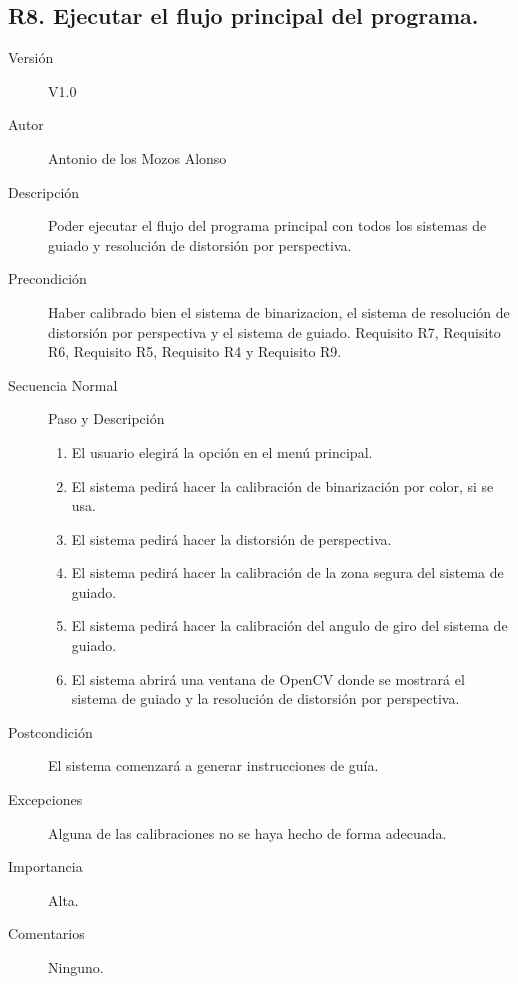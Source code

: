 \subsection{R8. Ejecutar el flujo principal del programa.}
\begin{description}
	\item [Versión] V1.0
	\item [Autor] Antonio de los Mozos Alonso
	\item [Descripción] Poder ejecutar el flujo del programa principal con todos los sistemas de guiado y resolución de distorsión por perspectiva.
	\item [Precondición] Haber calibrado bien el sistema de binarizacion, el sistema de resolución de distorsión por perspectiva y el sistema de guiado. Requisito R7, Requisito R6, Requisito R5, Requisito R4 y Requisito R9.
	\item [Secuencia Normal] Paso y Descripción
		\begin{enumerate}
			\item El usuario elegirá la opción en el menú principal.
			\item El sistema pedirá hacer la calibración de binarización por color, si se usa.
			
			\item El sistema pedirá hacer la distorsión de perspectiva.
			\item El sistema pedirá hacer la calibración de la zona segura del sistema de guiado.
			
			\item El sistema pedirá hacer la calibración del angulo de giro del sistema de guiado.
			
			\item El sistema abrirá una ventana de OpenCV donde se mostrará el sistema de guiado y la resolución de distorsión por perspectiva.
		\end{enumerate}
	\item [Postcondición] El sistema comenzará a generar instrucciones de guía.
	\item [Excepciones] Alguna de las calibraciones no se haya hecho de forma adecuada.
	\item [Importancia] Alta.
	\item [Comentarios] Ninguno.
\end{description}

